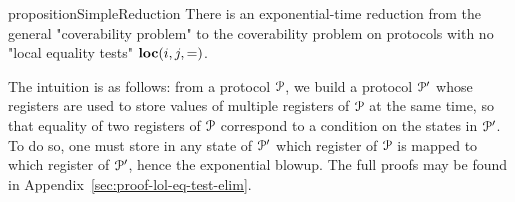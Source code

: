 \begin{restatable}{proposition}{SimpleReduction}
	\label{prop:loc-eq-test-elimination}
	There is an exponential-time reduction from the general "coverability problem" to the coverability problem on protocols with no "local equality tests" $\textbf{loc}(i,j,=)$.
\end{restatable}
The intuition is as follows: from a protocol $\mathcal{P}$, we build a protocol $\mathcal{P}'$ whose registers are used to store values of multiple registers of $\mathcal{P}$ at the same time, so that equality of two registers of $\mathcal{P}$ correspond to a condition on the states in $\mathcal{P}'$. To do so, one must store in any state of $\mathcal{P}'$ which register of $\mathcal{P}$ is mapped to which register of $\mathcal{P}'$, hence the exponential blowup. The full proofs may be found in Appendix~\ref{sec:proof-lol-eq-test-elim}.



